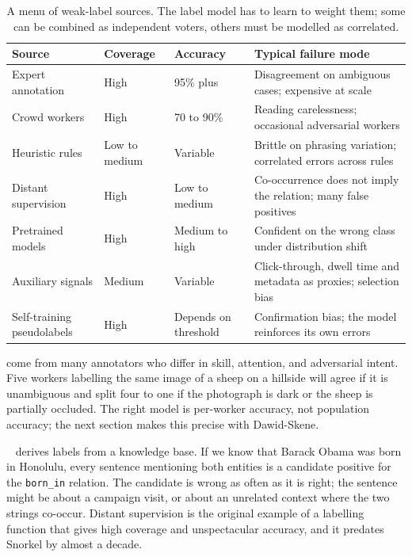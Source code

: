 \begin{table}[ht]
\centering
\begin{tabular}{p{}p{}p{}p{}}
    \toprule
    \textbf{Source} & \textbf{Coverage} & \textbf{Accuracy} & \textbf{Typical failure mode} \\
    \midrule
    Expert annotation & High & 95\% plus & Disagreement on ambiguous cases; expensive at scale \\
    Crowd workers & High & 70 to 90\% & Reading carelessness; occasional adversarial workers \\
    Heuristic rules & Low to medium & Variable & Brittle on phrasing variation; correlated errors across rules \\
    Distant supervision & High & Low to medium & Co-occurrence does not imply the relation; many false positives \\
    Pretrained models & High & Medium to high & Confident on the wrong class under distribution shift \\
    Auxiliary signals & Medium & Variable & Click-through, dwell time and metadata as proxies; selection bias \\
    Self-training pseudolabels & High & Depends on threshold & Confirmation bias; the model reinforces its own errors \\
    \bottomrule
\end{tabular}
\vspace{2em}
\caption{A menu of weak-label sources. The label model has to learn to weight them; some can be combined as independent voters, others must be modelled as correlated.}
\label{tab:weak_sources}
\end{table}

 come from many annotators who differ in skill, attention, and adversarial intent. Five workers labelling the same image of a sheep on a hillside will agree if it is unambiguous and split four to one if the photograph is dark or the sheep is partially occluded. The right model is per-worker accuracy, not population accuracy; the next section makes this precise with Dawid-Skene.

~\cite{Mintz2009DistantSupervision} derives labels from a knowledge base. If we know that Barack Obama was born in Honolulu, every sentence mentioning both entities is a candidate positive for the \verb|born_in| relation. The candidate is wrong as often as it is right; the sentence might be about a campaign visit, or about an unrelated context where the two strings co-occur. Distant supervision is the original example of a labelling function that gives high coverage and unspectacular accuracy, and it predates Snorkel by almost a decade.

